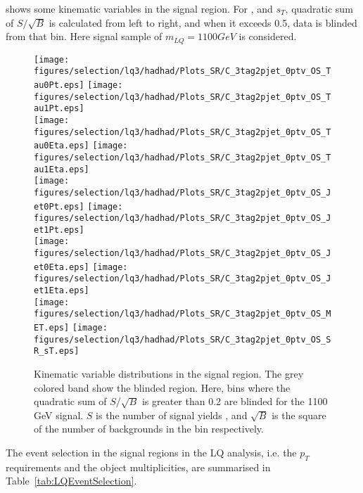  shows some kinematic variables in the signal region.
For \pT, \MET and $s_T$, quadratic sum of $S/\sqrt{B}$ is calculated from left to right, and when it exceeds 0.5, data is blinded from that bin.
Here signal sample of $m_{LQ} = 1100 GeV$ is considered.

\begin{figure}[!h]
  \centering
  \texttt{[image: figures/selection/lq3/hadhad/Plots\_SR/C\_3tag2pjet\_0ptv\_OS\_Tau0Pt.eps]} 
  \texttt{[image: figures/selection/lq3/hadhad/Plots\_SR/C\_3tag2pjet\_0ptv\_OS\_Tau1Pt.eps]} \\
  \texttt{[image: figures/selection/lq3/hadhad/Plots\_SR/C\_3tag2pjet\_0ptv\_OS\_Tau0Eta.eps]} 
  \texttt{[image: figures/selection/lq3/hadhad/Plots\_SR/C\_3tag2pjet\_0ptv\_OS\_Tau1Eta.eps]} \\
  \texttt{[image: figures/selection/lq3/hadhad/Plots\_SR/C\_3tag2pjet\_0ptv\_OS\_Jet0Pt.eps]} 
  \texttt{[image: figures/selection/lq3/hadhad/Plots\_SR/C\_3tag2pjet\_0ptv\_OS\_Jet1Pt.eps]} \\
  \texttt{[image: figures/selection/lq3/hadhad/Plots\_SR/C\_3tag2pjet\_0ptv\_OS\_Jet0Eta.eps]} 
  \texttt{[image: figures/selection/lq3/hadhad/Plots\_SR/C\_3tag2pjet\_0ptv\_OS\_Jet1Eta.eps]} \\
  \texttt{[image: figures/selection/lq3/hadhad/Plots\_SR/C\_3tag2pjet\_0ptv\_OS\_MET.eps]} 
  \texttt{[image: figures/selection/lq3/hadhad/Plots\_SR/C\_3tag2pjet\_0ptv\_OS\_SR\_sT.eps]} 
  \caption{Kinematic variable distributions in the signal region. The grey colored band show the blinded region. Here, bins where the quadratic sum of $S/\sqrt{B}$ is greater than 0.2 are blinded for the 1100 GeV signal. $S$ is the number of signal yields , and $\sqrt{B}$ is the square of the number of backgrounds in the bin respectively.}
  \label{fig:selection_lq_hadhad:kinematic_variables}
\end{figure}


The event selection in the signal regions in the LQ analysis, i.e. the $p_T$ requirements and the object multiplicities, are summarised in Table~\ref{tab:LQEventSelection}.

